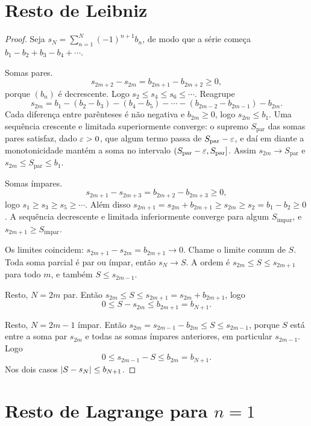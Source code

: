 \documentclass[11pt,a4paper]{article}
\begin{document}
\section{Resto de Leibniz}

\begin{proof}
Seja \(s_N=\sum_{n=1}^N (-1)^{n+1} b_n\), de modo que a série começa \(b_1-b_2+b_3-b_4+\cdots\).

Somas pares. 
\[
s_{2m+2}-s_{2m}=b_{2m+1}-b_{2m+2}\ge 0,
\]
porque \((b_n)\) é decrescente. Logo \(s_2\le s_4\le s_6\le\cdots\). Reagrupe
\[
s_{2m}=b_1-(b_2-b_3)-(b_4-b_5)-\cdots-(b_{2m-2}-b_{2m-1})-b_{2m}.
\]
Cada diferença entre parênteses é não negativa e \(b_{2m}\ge 0\), logo \(s_{2m}\le b_1\). Uma sequência crescente e limitada superiormente converge: o supremo \(S_{\mathrm{par}}\) das somas pares satisfaz, dado \(\varepsilon>0\), que algum termo passa de \(S_{\mathrm{par}}-\varepsilon\), e daí em diante a monotonicidade mantém a soma no intervalo \((S_{\mathrm{par}}-\varepsilon,S_{\mathrm{par}}]\). Assim \(s_{2m}\to S_{\mathrm{par}}\) e \(s_{2m}\le S_{\mathrm{par}}\le b_1\).

Somas ímpares.
\[
s_{2m+1}-s_{2m+3}=b_{2m+2}-b_{2m+3}\ge 0,
\]
logo \(s_1\ge s_3\ge s_5\ge\cdots\). Além disso \(s_{2m+1}=s_{2m}+b_{2m+1}\ge s_{2m}\ge s_2=b_1-b_2\ge 0\). A sequência decrescente e limitada inferiormente converge para algum \(S_{\mathrm{impar}}\), e \(s_{2m+1}\ge S_{\mathrm{impar}}\).

Os limites coincidem: \(s_{2m+1}-s_{2m}=b_{2m+1}\to 0\). Chame o limite comum de \(S\). Toda soma parcial é par ou ímpar, então \(s_N\to S\). A ordem é \(s_{2m}\le S\le s_{2m+1}\) para todo \(m\), e também \(S\le s_{2m-1}\).

Resto, \(N=2m\) par. Então \(s_{2m}\le S\le s_{2m+1}=s_{2m}+b_{2m+1}\), logo
\[
0\le S-s_{2m}\le b_{2m+1}=b_{N+1}.
\]

Resto, \(N=2m-1\) ímpar. Então \(s_{2m}=s_{2m-1}-b_{2m}\le S\le s_{2m-1}\), porque \(S\) está entre a soma par \(s_{2m}\) e todas as somas ímpares anteriores, em particular \(s_{2m-1}\). Logo
\[
0\le s_{2m-1}-S\le b_{2m}=b_{N+1}.
\]
Nos dois casos \(\left\lvert S-s_N \right\rvert\le b_{N+1}\).
\end{proof}

\section{Resto de Lagrange para \(n=1\)}
\end{document}
